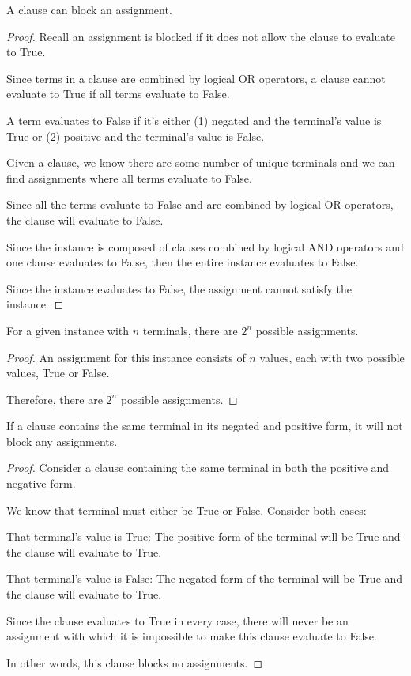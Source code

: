\documentclass[manuscript]{acmart}
\begin{document}
    \begin{lemma}
        A clause can block an assignment.
    \end{lemma}
    \begin{proof}
        Recall an assignment is blocked if it does not allow the clause to evaluate to True.

        Since terms in a clause are combined by logical OR operators, a clause cannot evaluate to True if all terms evaluate to False.

        A term evaluates to False if it's either (1) negated and the terminal's value is True or (2) positive and the terminal's value is False.

        Given a clause, we know there are some number of unique terminals and we can find assignments where all terms evaluate to False.

        Since all the terms evaluate to False and are combined by logical OR operators, the clause will evaluate to False.

        Since the instance is composed of clauses combined by logical AND operators and one clause evaluates to False, then the entire instance evaluates to False.

        Since the instance evaluates to False, the assignment cannot satisfy the instance.
    \end{proof}

    \begin{lemma}        
        For a given instance with $n$ terminals, there are $2^n$ possible assignments.
    \end{lemma}
    \begin{proof}
        An assignment for this instance consists of $n$ values, each with two possible values, True or False.

        Therefore, there are $2^n$ possible assignments.
    \end{proof}

    \begin{lemma}
        If a clause contains the same terminal in its negated and positive form, it will not block any assignments.
    \end{lemma}
    \begin{proof}

        Consider a clause containing the same terminal in both the positive and negative form.

        We know that terminal must either be True or False. Consider both cases:

        That terminal's value is True: The positive form of the terminal will be True and the clause will evaluate to True.

        That terminal's value is False: The negated form of the terminal will be True and the clause will evaluate to True.

        Since the clause evaluates to True in every case, there will never be an assignment with which it is impossible to make this clause evaluate to False.

        In other words, this clause blocks no assignments.
    \end{proof}
\end{document}

